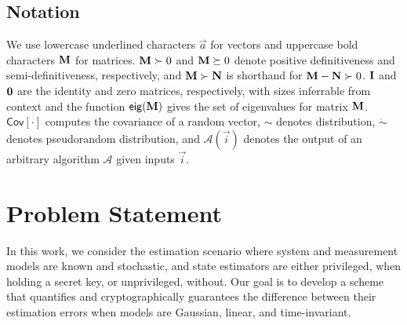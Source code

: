 \documentclass[letterpaper, 10 pt, conference]{ieeeconf}
\begin{document}
% 
% 

\subsection{Notation}
We use lowercase underlined characters $\vec{a}$ for vectors and uppercase bold characters ${{\mathbf{M}}}$ for matrices. ${{\mathbf{M}}}\succ 0$ and ${{\mathbf{M}}} \succeq 0$ denote positive definitiveness and semi-definitiveness, respectively, and ${{\mathbf{M}}} \succ {\ensuremath{{\mathbf{N}}}}$ is shorthand for ${{\mathbf{M}}}-{{\mathbf{N}}}\succ 0$. ${{\mathbf{I}}}$ and ${{\mathbf{0}}}$ are the identity and zero matrices, respectively, with sizes inferrable from context and the function $\mathsf{eig}({{\mathbf{M}}})$ gives the set of eigenvalues for matrix ${{\mathbf{M}}}$. $\mathsf{Cov}[\cdot]$ computes the covariance of a random vector, $\sim$ denotes distribution, $\dot{\sim}$ denotes pseudorandom distribution, and $\mathcal{A}(\vec{i})$ denotes the output of an arbitrary algorithm $\mathcal{A}$ given inputs $\vec{i}$.

% 
%                                              
%                                              
%                                              
% 

\section{Problem Statement}\label{sec:problem_statement}
In this work, we consider the estimation scenario where system and measurement models are known and stochastic, and state estimators are either privileged, when holding a secret key, or unprivileged, without. Our goal is to develop a scheme that quantifies and cryptographically guarantees the difference between their estimation errors when models are Gaussian, linear, and time-invariant.
\end{document}

